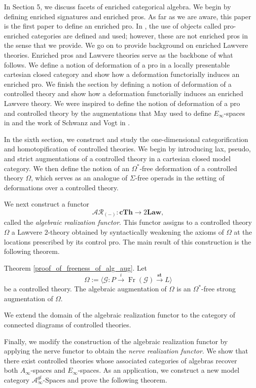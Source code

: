 \documentclass{tac}
\begin{document}
 In Section 5, we discuss facets of enriched categorical algebra. We begin by defining enriched signatures and enriched pros. As far as we are aware, this paper is the first paper to define an enriched pro. In \cite{Uglesic2019}, the use of objects called pro-enriched categories are defined and used; however, these are not enriched pros in the sense that we provide. We go on to provide background on enriched Lawvere theories. Enriched pros and Lawvere theories serve as the backbone of what follows. We define a notion of deformation of a pro in a locally presentable cartesian closed category and show how a deformation functorially induces an enriched pro. We finish the section by defining a notion of deformation of a controlled theory and show how a deformation functorially induces an enriched Lawvere theory.
 We were inspired to define the notion of deformation of a pro and controlled theory by the augmentations that May used to define $E_\infty$-spaces in \cite{May2} and the work of Schwanz and Vogt in \cite{SchwanzlVogt1989}. 
 

In the sixth section, we construct and study the one-dimensional
categorification and homotopification of controlled theories. We begin by
introducing lax, pseudo, and strict augmentations of a controlled theory in a
cartesian closed model category. We then define the notion of an
$\Omega^*$-free deformation of a controlled theory $\Omega$, which serves as an analogue of $\Sigma$-free operads in the setting of
deformations over a controlled theory.

We next construct a functor
\[
\mathcal{AR}_{(-)}:\mathbf{cTh}\longrightarrow 2\mathbf{Law},
\]
called the \emph{algebraic realization functor}. This functor assigns to a
controlled theory $\Omega$ a Lawvere $2$-theory obtained by syntactically
weakening the axioms of $\Omega$ at the locations prescribed by its control
pro. The main result of this construction is the following theorem.


Theorem \ref{proof_of_freeness_of_alg_aug}.  Let
\[
\Omega:=\langle \mathcal{G}:P\xrightarrow{i}\operatorname{Fr}(\mathcal{G})
\xrightarrow{\mathbf{st}}L\rangle
\]
be a controlled theory. The algebraic augmentation of $\Omega$ is an
$\Omega^*$-free strong augmentation of $\Omega$.  


We extend the domain of the algebraic realization functor to the category of
connected diagrams of controlled theories.

Finally, we modify the construction of the algebraic realization functor by
applying the nerve functor to obtain the \emph{nerve realization functor}. We
show that there exist controlled theories whose associated categories of
algebras recover both $A_\infty$-spaces and $E_\infty$-spaces. As an
application, we construct a new model category $\mathcal{A}^{gl}_{\infty}\text{-Spaces}$ and prove the following theorem.
\end{document}
